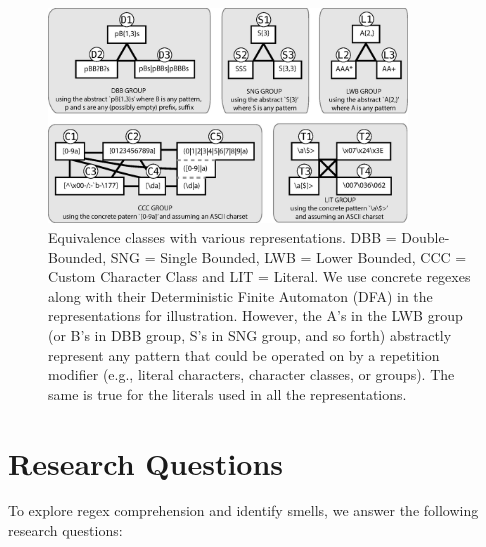 \begin{figure}[tb]
\centering
\includegraphics[width=0.85\textwidth]{illustrations/refactoringTree.eps}
\vspace{-6pt}
\caption{Equivalence classes with various representations. DBB = Double-Bounded, SNG = Single Bounded, LWB = Lower Bounded, CCC = Custom Character Class and LIT = Literal. We use concrete regexes along with their Deterministic Finite Automaton (DFA) in the representations for illustration. However, the A's in the LWB group (or B's in DBB group, S's in SNG group, and so forth) abstractly represent any pattern that could be operated on by a repetition modifier (e.g., literal characters, character classes, or groups). The same is true for the literals used in all the representations. }
\vspace{-6pt}
\label{fig:refactoringTree}
\end{figure}


\section{Research Questions}
\label{sec:study}

To explore regex comprehension and identify smells, we answer the following research questions: \\

